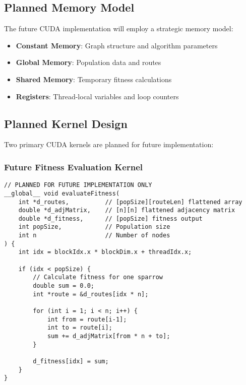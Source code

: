 \documentclass[conference]{IEEEtran}
\begin{document}
\subsection{Planned Memory Model}
The future CUDA implementation will employ a strategic memory model:

\begin{itemize}
    \item \textbf{Constant Memory}: Graph structure and algorithm parameters
    \item \textbf{Global Memory}: Population data and routes
    \item \textbf{Shared Memory}: Temporary fitness calculations
    \item \textbf{Registers}: Thread-local variables and loop counters
\end{itemize}

\subsection{Planned Kernel Design}
Two primary CUDA kernels are planned for future implementation:

\subsubsection{Future Fitness Evaluation Kernel}
\begin{lstlisting}[caption=Future Parallel Fitness Evaluation]
// PLANNED FOR FUTURE IMPLEMENTATION ONLY
__global__ void evaluateFitness(
    int *d_routes,          // [popSize][routeLen] flattened array
    double *d_adjMatrix,    // [n][n] flattened adjacency matrix
    double *d_fitness,      // [popSize] fitness output
    int popSize,            // Population size
    int n                   // Number of nodes
) {
    int idx = blockIdx.x * blockDim.x + threadIdx.x;

    if (idx < popSize) {
        // Calculate fitness for one sparrow
        double sum = 0.0;
        int *route = &d_routes[idx * n];

        for (int i = 1; i < n; i++) {
            int from = route[i-1];
            int to = route[i];
            sum += d_adjMatrix[from * n + to];
        }

        d_fitness[idx] = sum;
    }
}
\end{lstlisting}
\end{document}
